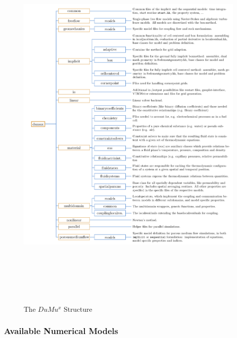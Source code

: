 \begin{figure}[p]
\centering
\includegraphics[height=190mm]{dumux_structure}
\caption{\footnotesize The $DuMu^x$ Structure}
\label{fig:dumux_structure}
\end{figure}

\newpage
\subsubsection*{Available Numerical Models}

